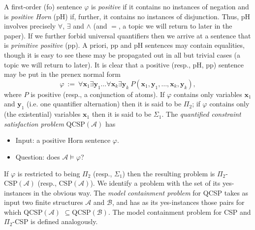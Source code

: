 \documentclass{LMCS}
\newcommand{\tuple}[1]{\ensuremath{\mathbf{#1}}}
\begin{document}
A first-order (fo) sentence $\varphi$ is \emph{positive} if it contains no instances of negation and is \emph{positive Horn} (pH) if, further, it contains no instances of disjunction. Thus, pH involves precisely $\forall$, $\exists$ and $\wedge$ (and $=$, a topic we will return to later in the paper). If we further forbid universal quantifiers then we arrive at a sentence that is \emph{primitive positive} (pp). A priori, pp and pH sentences may contain equalities, though it is easy to see these may be propagated out in all but trivial cases (a topic we will return to later). It is clear that a positive (resp., pH, pp) sentence may be put in the prenex normal form
\[\varphi \ := \ \forall \tuple{x}_1 \exists \tuple{y}_1 \ldots \forall \tuple{x}_k \exists \tuple{y}_k \ P(\tuple{x}_1,\tuple{y}_1,\ldots,\tuple{x}_k,\tuple{y}_k), \]
where $P$ is positive (resp., a conjunction of atoms). If $\varphi$ contains only variables $\tuple{x}_1$ and $\tuple{y}_1$ (i.e. one quantifier alternation) then it is said to be $\Pi_2$; if $\varphi$ contains only (the existential) variables $\tuple{x}_1$ then it is said to be $\Sigma_1$.
The \emph{quantified constraint satisfaction problem} $\mathrm{QCSP}(\mathcal{A})$ has
\begin{itemize}
\item Input: a positive Horn sentence $\varphi$.
\item Question: does $\mathcal{A} \models \varphi$?
\end{itemize}
If $\varphi$ is restricted to being $\Pi_2$ (resp., $\Sigma_1$) then the resulting problem is $\Pi_2$-$\mathrm{CSP}(\mathcal{A})$ (resp., $\mathrm{CSP}(\mathcal{A})$). We identify a problem with the set of its yes-instances in the obvious way. The \emph{model containment problem} for QCSP takes as input two finite structures $\mathcal{A}$ and $\mathcal{B}$, and has as its yes-instances those pairs for which $\mathrm{QCSP}(\mathcal{A})$ $\subseteq \mathrm{QCSP}(\mathcal{B})$. The model containment problem for CSP and $\Pi_2$-CSP is defined analogously.
\end{document}
